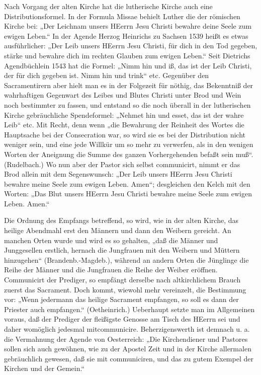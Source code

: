 Nach Vorgang der alten Kirche hat die lutherische Kirche auch eine Distributionsformel. In der Formula Missae behielt Luther die der römischen Kirche bei: „Der Leichnam unsers HEerrn Jesu Christi bewahre deine Seele zum ewigen Leben.“ In der Agende Herzog Heinrichs zu Sachsen 1539 heißt es etwas ausführlicher: „Der Leib unsers HEerrn Jesu Christi, für dich in den Tod gegeben, stärke und bewahre dich im rechten Glauben zum ewigen Leben.“ Seit Dietrichs
Agendbüchlein 1543 hat die Formel: „Nimm hin und iß, das ist der Leib Christi, der für dich gegeben ist. Nimm hin und trink“ etc. Gegenüber den Sacramentirern aber hielt man es in der Folgezeit für nöthig, das Bekenntniß der wahrhaftigen Gegenwart des Leibes und Blutes Christi unter Brod und Wein noch bestimmter zu fassen, und entstand so die noch überall in der lutherischen Kirche gebräuchliche Spendeformel: „Nehmet hin und esset, das ist der wahre Leib“ etc. Mit Recht, denn wenn „die Bewahrung der Reinheit des Wortes die Hauptsache bei der Consecration war, so wird sie es bei der Distribution nicht weniger sein, und eine jede Willkür um so mehr zu verwerfen, als in den wenigen Worten der Aneignung die Summe des ganzen Vorhergehenden befaßt sein muß“. (Rudelbach.) Wo nun aber der Pastor sich selbst communicirt, nimmt er das Brod allein mit dem Segenswunsch: „Der Leib unsers HEerrn Jesu Christi bewahre meine Seele zum ewigen Leben. Amen“; desgleichen den Kelch mit den Worten: „Das Blut unsers HEerrn Jesu Christi bewahre meine Seele zum ewigen Leben. Amen.“

Die Ordnung des Empfangs betreffend, so wird, wie in der alten Kirche, das heilige Abendmahl erst den Männern und dann den Weibern gereicht. An manchen Orten wurde und wird es so gehalten, „daß die Männer und Junggesellen erstlich, hernach die Jungfrauen mit den Weibern und Müttern hinzugehen“ (Brandenb.-Magdeb.), während an andern Orten die Jünglinge die Reihe der Männer und die Jungfrauen die Reihe der Weiber eröffnen. Communicirt der Prediger, so empfängt derselbe nach altkirchlichem Brauch zuerst das Sacrament. Doch kommt, wiewohl mehr vereinzelt, die Bestimmung vor: „Wenn jedermann das heilige Sacrament empfangen, so soll es dann der Priester auch empfangen.“ (Oetheinrich.) Ueberhaupt setzte man im Allgemeinen voraus, daß der Prediger der fleißigste Genosse am Tisch des HEerrn sei und daher womöglich jedesmal mitcommunicire. Beherzigenswerth ist demnach u. a. die Vermahnung der Agende von Oesterreich: „Die Kirchendiener und Pastores sollen sich auch gewöhnen, wie zu der Apostel Zeit und in der Kirche allermalen gebräuchlich gewesen, daß sie mit communiciren, und das zu gutem Exempel der Kirchen und der Gemein.“

